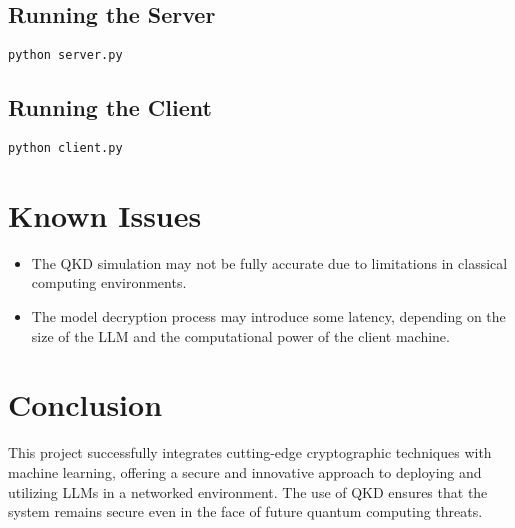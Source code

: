 \documentclass{article}
\begin{document}
\subsection{Running the Server}
\begin{verbatim}
python server.py
\end{verbatim}

\subsection{Running the Client}
\begin{verbatim}
python client.py
\end{verbatim}

\section{Known Issues}
\begin{itemize}
    \item The QKD simulation may not be fully accurate due to limitations in classical computing environments.
    \item The model decryption process may introduce some latency, depending on the size of the LLM and the computational power of the client machine.
\end{itemize}

\section{Conclusion}
This project successfully integrates cutting-edge cryptographic techniques with machine learning, offering a secure and innovative approach to deploying and utilizing LLMs in a networked environment. The use of QKD ensures that the system remains secure even in the face of future quantum computing threats.
\end{document}
